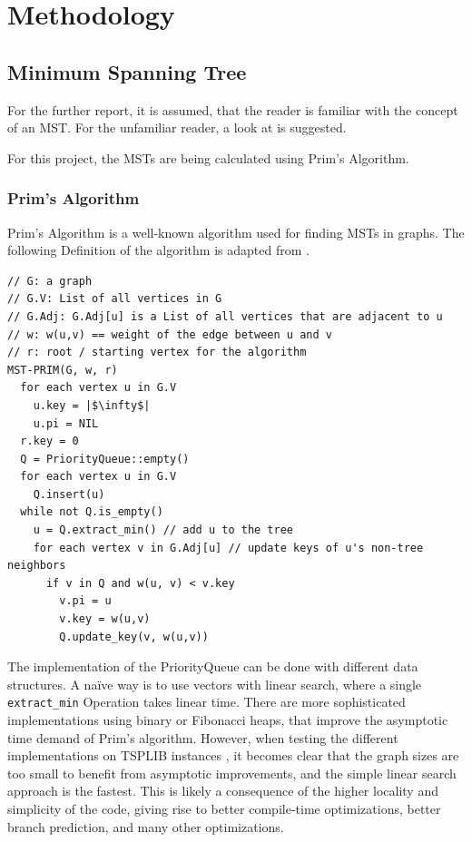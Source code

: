 \section{Methodology}

\subsection{Minimum Spanning Tree}
\label{sec:mst}

For the further report, it is assumed, that the reader is familiar with the concept of
an \ac{MST}. For the unfamiliar reader, a look at \cite[pp. 585ff.]{cormen_introduction_2022}
is suggested.

For this project, the \ac{MST}s are being calculated using
Prim's Algorithm.

\subsubsection{Prim's Algorithm}

Prim's Algorithm is a well-known algorithm used for 
finding \ac{MST}s in graphs.
The following Definition of the algorithm is adapted from
\cite[p. 596]{cormen_introduction_2022}.

\begin{verbatim}
// G: a graph
// G.V: List of all vertices in G
// G.Adj: G.Adj[u] is a List of all vertices that are adjacent to u
// w: w(u,v) == weight of the edge between u and v
// r: root / starting vertex for the algorithm
MST-PRIM(G, w, r)
  for each vertex u in G.V
    u.key = |$\infty$|
    u.pi = NIL
  r.key = 0
  Q = PriorityQueue::empty()
  for each vertex u in G.V
    Q.insert(u)
  while not Q.is_empty()
    u = Q.extract_min() // add u to the tree
    for each vertex v in G.Adj[u] // update keys of u's non-tree neighbors
      if v in Q and w(u, v) < v.key
        v.pi = u
        v.key = w(u,v)
        Q.update_key(v, w(u,v))
\end{verbatim}

The implementation of the PriorityQueue can be done with different
data structures.
A na\"ive way is to use vectors with linear search,
where a single \texttt{extract\_min} Operation takes linear time.
There are more sophisticated implementations using
binary or Fibonacci heaps, that improve the asymptotic
time demand of Prim's algorithm.
However, when testing the different implementations on
TSPLIB instances \cite{reinelt_tsplib_nodate}, it becomes clear that the
graph sizes are too small to benefit from asymptotic improvements,
and the simple linear search approach is the fastest.
This is likely a consequence of the higher locality and simplicity
of the code, giving rise to better compile-time optimizations,
better branch prediction, and many other optimizations.

